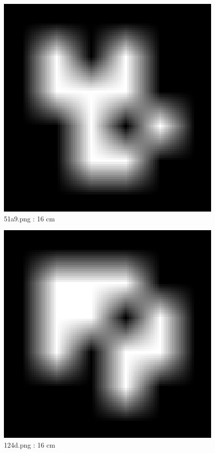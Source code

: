 \documentclass[11pt,a4,BCOR=0cm]{scrartcl}
\begin{document}
\newpage
\begin{figure}
  \begin{center}
    \includegraphics[natwidth=6,natheight=6,width=16cm]{51a9.png}
    \caption{51a9.png : 16 cm}
    \label{fig:51a9.png}
  \end{center}
\end{figure}
\newpage
\begin{figure}
  \begin{center}
    \includegraphics[natwidth=6,natheight=6,width=16cm]{124d.png}
    \caption{124d.png : 16 cm}
    \label{fig:124d.png}
  \end{center}
\end{figure}
\end{document}
